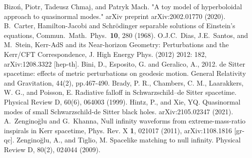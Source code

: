 \documentclass[a4paper]{article}
\begin{document}
\newpage
\begin{thebibliography}{}
 Bizoń, Piotr, Tadeusz Chmaj, and Patryk Mach. "A toy model of hyperboloidal approach to quasinormal modes." arXiv preprint arXiv:2002.01770 (2020).
 B.~Carter, Hamilton-Jacobi and Schr\"{o}dinger separable solutions of Einstein's equations, Commun.~Math.~Phys.~{\bf 10}, 280 (1968).
 O.J.C.~Dias, J.E.~Santos, and M.~Stein, Kerr-AdS and its Near-horizon Geometry: Perturbations and the Kerr/CFT Correspondence, J. High Energy Phys. (2012) 2012: 182, arXiv:1208.3322 [hep-th]. 
 Bini, D., Esposito, G. and Geralico, A., 2012. de Sitter spacetime: effects of metric perturbations on geodesic motion. General Relativity and Gravitation, 44(2), pp.467-490.
 Brady, P. R., Chambers, C. M., Laarakkers, W. G., and Poisson, E. Radiative falloff in Schwarzschild–de Sitter spacetime. Physical Review D, 60(6), 064003 (1999).
 Hintz, P., and Xie, YQ. Quasinormal modes of small Schwarzschild-de Sitter black holes. arXiv:2105.02347 (2021).
 A.~Zengino\u{g}lu and G.~Khanna, Null infinity waveforms from extreme-mass-ratio inspirals in Kerr spacetime, Phys. Rev. X {\bf 1}, 021017 (2011), arXiv:1108.1816  [gr-qc].
 Zengino\u{g}lu, A., and Tiglio, M. Spacelike matching to null infinity. Physical Review D, 80(2), 024044 (2009). 
\end{thebibliography}
\end{document}
